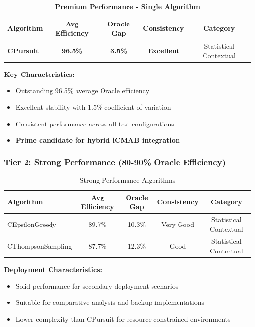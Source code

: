 \documentclass[12pt,a4paper]{article}
\newcommand{\success}[1]{\textcolor{successcolor}{\textbf{#1}}}
\begin{document}
\begin{table}[H]
\centering
\caption{\success{Premium Performance - Single Algorithm}}
\begin{tabular}{|l|c|c|c|c|}
\hline
\textbf{Algorithm} & \textbf{Avg Efficiency} & \textbf{Oracle Gap} & \textbf{Consistency} & \textbf{Category} \\
\hline
\hline
\success{CPursuit} & \success{\textbf{96.5\%}} & \success{3.5\%} & \success{Excellent} & Statistical Contextual \\
\hline
\end{tabular}
\end{table}

\textbf{Key Characteristics:}
\begin{itemize}
\item Outstanding 96.5\% average Oracle efficiency
\item Excellent stability with 1.5\% coefficient of variation
\item Consistent performance across all test configurations
\item \success{Prime candidate for hybrid iCMAB integration}
\end{itemize}

\subsubsection{Tier 2: Strong Performance (80-90\% Oracle Efficiency)}

\begin{table}[H]
\centering
\caption{Strong Performance Algorithms}
\begin{tabular}{|l|c|c|c|c|}
\hline
\textbf{Algorithm} & \textbf{Avg Efficiency} & \textbf{Oracle Gap} & \textbf{Consistency} & \textbf{Category} \\
\hline
\hline
CEpsilonGreedy & 89.7\% & 10.3\% & Very Good & Statistical Contextual \\
CThompsonSampling & 87.7\% & 12.3\% & Good & Statistical Contextual \\
\hline
\end{tabular}
\end{table}

\textbf{Deployment Characteristics:}
\begin{itemize}
\item Solid performance for secondary deployment scenarios
\item Suitable for comparative analysis and backup implementations
\item Lower complexity than CPursuit for resource-constrained environments
\end{itemize}
\end{document}
